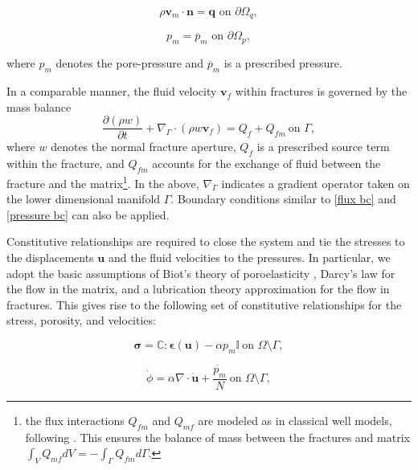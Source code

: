 \begin{equation}\label{flux bc}
    \rho \textbf{v}_m \cdot \textbf{n} = \textbf{q} \text{ on } \partial \Omega_q,
\end{equation}

\begin{equation}\label{pressure bc}
    p_m = \overline{p}_m \text{ on } \partial \Omega_p,
\end{equation}

where $p_m$ denotes the pore-pressure and  $\overline{p}_m$ is a prescribed pressure.

In a comparable manner, the fluid velocity $\textbf{v}_f$ within fractures is governed by the mass balance
\begin{equation}\label{mass balance fracture}
    \dfrac{\partial(\rho w)}{\partial t} + \nabla_{\Gamma} \cdot (\rho w \textbf{v}_f) = Q_f + Q_{fm}\ \text{on } \Gamma,
\end{equation}
where $w$ denotes the normal fracture aperture, $Q_f$ is a prescribed source term within the fracture, and $Q_{fm}$ accounts for the exchange of fluid between the fracture and the matrix\footnote{the flux interactions $Q_{fm}$ and $Q_{mf}$ are modeled as in classical well models, following \cite{hajibeygi2011hierarchical}. This ensures the balance of mass between the fractures and matrix $\int_V Q_{mf} dV = -\int_{\Gamma}Q_{fm}d\Gamma$.}. In the above, $\nabla_{\Gamma}$ indicates a gradient operator taken on the lower dimensional manifold  $\Gamma$. Boundary conditions similar to \eqref{flux bc} and \eqref{pressure bc} can also be applied.

Constitutive relationships are required to close the system and tie the stresses to the displacements $\textbf{u}$ and the fluid velocities to the pressures. In particular, we adopt the basic assumptions of Biot's theory of poroelasticity \cite{biot1941general}, Darcy's law for the flow in the matrix, and a lubrication theory approximation for the flow in fractures. This gives rise to the following set of constitutive relationships for the stress, porosity, and velocities:

\begin{equation}\label{biot law}
    \boldsymbol \sigma = \mathbb{C}:\boldsymbol\epsilon(\textbf{u}) - \alpha p_m \mathbb{I} \ \text{on } \Omega\setminus\Gamma,
\end{equation}

\begin{equation}\label{linear porosity}
    \dot{\phi} = \alpha \nabla \cdot \dot{\textbf{u}} + \dfrac{\dot{p_m}}{N} \ \text{on } \Omega\setminus\Gamma,
\end{equation}

